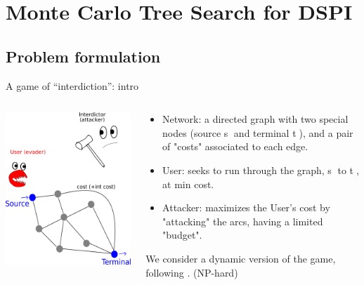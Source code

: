 \documentclass[10pt, xcolor=svgnames]{beamer}
\begin{document}
\section{Monte Carlo Tree Search for DSPI}
\label{sec:org7700361}
\subsection{Problem formulation}
\label{sec:orgbed14e0}
\begin{frame}[label={sec:orgf3a62b1}]{A game of ``interdiction'': intro}
\begin{columns}
\begin{column}[t]{0.4\columnwidth}
\begin{center}
\includegraphics[width=.9\linewidth]{./img/SPI.png}
\end{center}
\end{column}

\begin{column}[t]{0.6\columnwidth}
\begin{itemize}
\item \alert{Network:} a directed graph with two special nodes (source \textcircled{s} and terminal \textcircled{t}), and a pair of "costs" associated to each edge.
\item \alert{User:} seeks to run through the graph, \textcircled{s} to \textcircled{t}, at min cost.
\item \alert{Attacker:} maximizes the User's cost by "attacking" the arcs, having a limited "budget".
\end{itemize}

We consider a \alert{dynamic} version of the game, following \cite{sefair2016}. (NP-hard)
\end{column}
\end{columns}
\end{frame}
\end{document}
